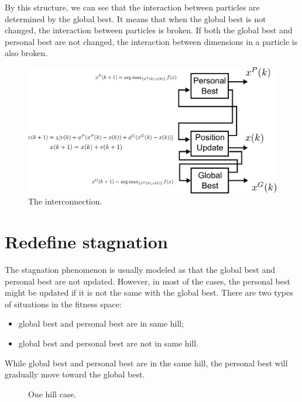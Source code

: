 \documentclass[10pt,a4paper]{article}
\begin{document}
By this structure, we can see that the interaction between particles are determined by the global best.
It means that when the global best is not changed, the interaction between particles is broken.
If both the global best and personal best are not changed, the interaction between dimensions in a particle is also broken.

\begin{figure}
\centering
\includegraphics[width=0.9\linewidth]{./structure}
\caption{The interconnection.}
\label{fig:structure}
\end{figure}

\section{Redefine stagnation}

The stagnation phenomenon is usually modeled as that the global best and personal best are not updated.
However, in most of the cases, the personal best might be updated if it is not the same with the global best.
There are two types of situations in the fitness space:
\begin{itemize}
\item global best and personal best are in same hill;
\item global best and personal best are not in same hill.
\end{itemize}

While global best and personal best are in the same hill, the personal best will gradually move toward the global best.

\begin{figure}
\centering
{}
\caption{One hill case.}
\label{fig:one_hill_case}
\end{figure}
\end{document}
